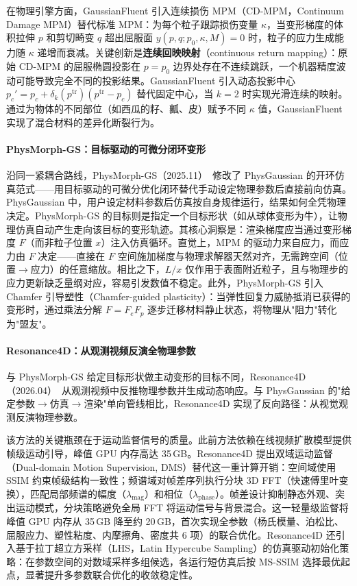 在物理引擎方面，GaussianFluent 引入连续损伤 MPM（CD-MPM，Continuum Damage MPM）替代标准 MPM：为每个粒子跟踪损伤变量 $\kappa$，当变形梯度的体积拉伸 $p$ 和剪切畸变 $q$ 超出屈服面 $y(p, q; p_0, \kappa, M) = 0$ 时，粒子的应力生成能力随 $\kappa$ 递增而衰减。关键创新是\textbf{连续回映映射}（continuous return mapping）：原始 CD-MPM 的屈服椭圆投影在 $p = p_0$ 边界处存在不连续跳跃，一个机器精度波动可能导致完全不同的投影结果。GaussianFluent 引入动态投影中心 $p_c' = p_c + \delta_k(p^{\text{tr}})(p^{\text{tr}} - p_c)$ 替代固定中心，当 $k=2$ 时实现光滑连续的映射。通过为物体的不同部位（如西瓜的籽、瓤、皮）赋予不同 $\kappa$ 值，GaussianFluent 实现了混合材料的差异化断裂行为。

\paragraph{PhysMorph-GS：目标驱动的可微分闭环变形}

沿同一紧耦合路线，PhysMorph-GS（2025.11）~\cite{2511_16988}修改了 PhysGaussian 的开环仿真范式——用目标驱动的可微分优化闭环替代手动设定物理参数后直接前向仿真。PhysGaussian 中，用户设定材料参数后仿真按自身规律运行，结果如何全凭物理决定。PhysMorph-GS 的目标则是指定一个目标形状（如从球体变形为牛），让物理仿真自动产生走向该目标的变形轨迹。其核心洞察是：渲染梯度应当通过变形梯度 $F$（而非粒子位置 $x$）注入仿真循环。直觉上，MPM 的驱动力来自应力，而应力由 $F$ 决定——直接在 $F$ 空间施加梯度与物理求解器天然对齐，无需跨空间（位置$\to$应力）的任意缩放。相比之下，$L/x$ 仅作用于表面附近粒子，且与物理步的应力更新缺乏量纲对应，容易引发数值不稳定。此外，PhysMorph-GS 引入 Chamfer 引导塑性（Chamfer-guided plasticity）：当弹性回复力威胁抵消已获得的变形时，通过乘法分解 $F = F_e F_p$ 逐步迁移材料静止状态，将物理从"阻力"转化为"盟友"。

\paragraph{Resonance4D：从观测视频反演全物理参数}

与 PhysMorph-GS 给定目标形状做主动变形的目标不同，Resonance4D（2026.04）~\cite{2604_01994}从观测视频中反推物理参数并生成动态响应。与 PhysGaussian 的"给定参数$\to$仿真$\to$渲染"单向管线相比，Resonance4D 实现了反向路径：从视觉观测反演物理参数。

该方法的关键瓶颈在于运动监督信号的质量。此前方法依赖在线视频扩散模型提供帧级运动引导，峰值 GPU 内存高达 35\,GB。Resonance4D 提出双域运动监督（Dual-domain Motion Supervision, DMS）替代这一重计算开销：空间域使用 SSIM 约束帧级结构一致性；频谱域对帧差序列执行分块 3D FFT（快速傅里叶变换），匹配局部频谱的幅度（$\lambda_{\text{mag}}$）和相位（$\lambda_{\text{phase}}$）。帧差设计抑制静态外观、突出运动模式，分块策略避免全局 FFT 将运动信号与背景混合。这一轻量级监督将峰值 GPU 内存从 35\,GB 降至约 20\,GB，首次实现全参数（杨氏模量、泊松比、屈服应力、塑性粘度、内摩擦角、密度共 6 项）的联合优化。Resonance4D 还引入基于拉丁超立方采样（LHS，Latin Hypercube Sampling）的仿真驱动初始化策略：在参数空间的对数域采样多组候选，各运行短仿真后按 MS-SSIM 选择最优起点，显著提升多参数联合优化的收敛稳定性。

